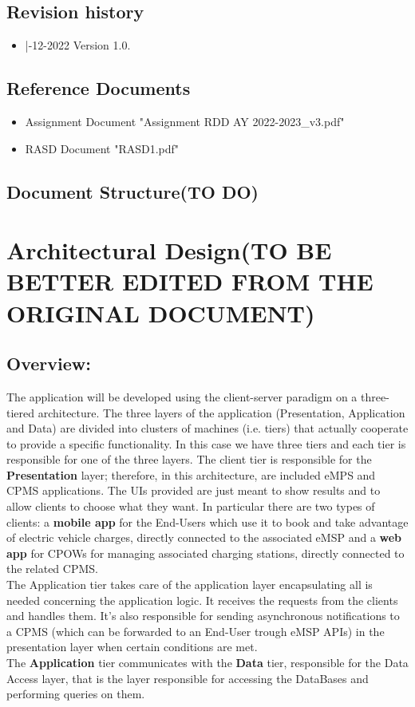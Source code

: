\documentclass[a4paper]{report}
\begin{document}
\section{Revision history}
\begin{itemize}
\item |-12-2022 Version 1.0.
\end{itemize}
\section{Reference Documents}
\begin{itemize}
\item Assignment Document "Assignment RDD AY 2022-2023\_v3.pdf"
\item RASD Document "RASD1.pdf"
\end{itemize}
\section{Document Structure(TO DO)}

\chapter{Architectural Design(TO BE BETTER EDITED FROM THE ORIGINAL DOCUMENT)}
\section{Overview:}
The application will be developed using the client-server paradigm on a three-tiered architecture. The three layers of the application (Presentation, Application and Data) are divided into clusters of machines (i.e. tiers) that actually cooperate to provide a specific functionality. In this case we have three tiers  and each tier is responsible for one of the three layers. The client tier is responsible for the \textbf{Presentation} layer; therefore, in this architecture, are included eMPS and CPMS applications. The UIs provided are just meant to show results and to allow clients to choose what they want. In particular there are two types of clients: a \textbf{mobile app} for the End-Users which use it to book and take advantage of electric vehicle charges, directly connected to the associated eMSP and a  \textbf{web app} for CPOWs for managing associated charging stations, directly connected to the related CPMS. \\
The Application tier takes care of the application layer encapsulating all is needed concerning the application logic. It receives the requests from the clients and handles them. It's also responsible for sending asynchronous notifications to a CPMS (which can be forwarded to an End-User trough eMSP APIs) in the presentation layer when certain conditions are met.\\
The \textbf{Application} tier communicates with the \textbf{Data} tier, responsible for the Data Access layer, that is the layer responsible for accessing the DataBases and performing queries on them.
\end{document}
